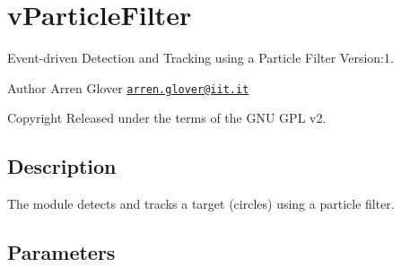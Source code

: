 \hypertarget{group__vParticleFilter}{}\section{v\+Particle\+Filter}
\label{group__vParticleFilter}
Event-\/driven Detection and Tracking using a Particle Filter Version\+:1. \begin{DoxyAuthor}{Author}
Arren Glover \href{mailto:arren.glover@iit.it}{\tt arren.\+glover@iit.\+it} ~\newline
 
\end{DoxyAuthor}
\begin{DoxyCopyright}{Copyright}
Released under the terms of the G\+NU G\+PL v2. 
\end{DoxyCopyright}
\hypertarget{group__zynqGrabber_intro_sec}{}\subsection{Description}\label{group__zynqGrabber_intro_sec}
The module detects and tracks a target (circles) using a particle filter.\hypertarget{group__zynqGrabber_parameters_sec}{}\subsection{Parameters}\label{group__zynqGrabber_parameters_sec}

